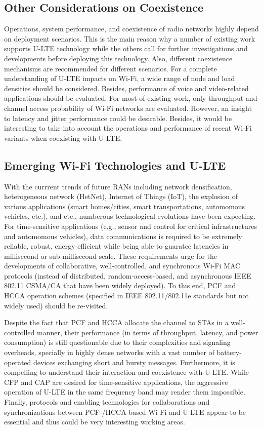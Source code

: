 \documentclass[12pt,onecolumn]{article}
\begin{document}
\subsection{Other Considerations on Coexistence}

Operations, system performance, and coexistence of radio networks highly depend on deployment scenarios. This is the main reason why a number of existing work supports U-LTE technology while the others call for further investigations and developments before deploying this technology. Also, different coexistence mechanisms are recommended for different scenarios. For a complete understanding of U-LTE impacts on Wi-Fi, a wide range of node and load densities should be considered. Besides, performance of voice and video-related applications should be evaluated. For most of existing work, only throughput and channel access probability of Wi-Fi networks are evaluated. However, an insight to latency and jitter performance could be desirable. Besides, it would be interesting to take into account the operations and performance of recent Wi-Fi variants when coexisting with U-LTE.

\subsection{Emerging Wi-Fi Technologies and U-LTE}

With the currrent trends of future RANs including network densification, heterogeneous network (HetNet), Internet of Things (IoT), the explosion of various applications (smart homes/cities, smart transportations, automomous vehicles, etc.), and etc., numberous technological evolutions have been expecting. For time-sensitive applications (e.g., sensor and control for critical infrastructures and automomous vehicles), data communications is required to be extremely reliable, robust, energy-efficient while being able to guaratee latencies in millisecond or sub-millisecond scale. These requirements urge for the developments of collaborative, well-controlled, and synchronous Wi-Fi MAC protocols (instead of distributed, random-access-based, and asynchronous IEEE 802.11 CSMA/CA that have been widely deployed). To this end, PCF and HCCA operation schemes (specified in IEEE 802.11/802.11e standards but not widely used) should be re-visited.

Despite the fact that PCF and HCCA allocate the channel to STAs in a well-controlled manner, their performance (in terms of throughput, latency, and power consumption) is still questionable due to their complexities and signaling overheads, specially in highly dense networks with a vast number of battery-operated devices exchanging short and bursty messages. Furthermore, it is compelling to understand their interaction and coexistence with U-LTE. While CFP and CAP are desired for time-sensitive applications, the aggressive operation of U-LTE in the same frequency band may render them impossible. Finally, protocols and enabling technologies for collaborations and synchronizations between PCF-/HCCA-based Wi-Fi and U-LTE appear to be essential and thus could be very interesting working areas.
\end{document}
